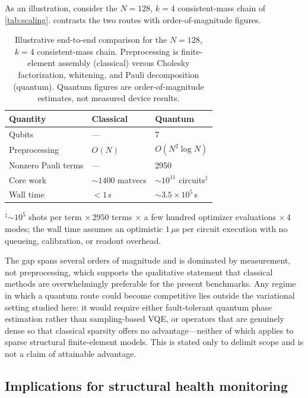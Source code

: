 \documentclass{ieeeaccess}
\begin{document}
As an illustration, consider the $N=128$, $k=4$ consistent-mass chain of \cref{tab:scaling}.  contrasts the two routes with order-of-magnitude figures.

\begin{table}[t]
\centering
\caption{Illustrative end-to-end comparison for the $N=128$, $k=4$ consistent-mass chain. Preprocessing is finite-element assembly (classical) versus Cholesky factorization, whitening, and Pauli decomposition (quantum). Quantum figures are order-of-magnitude estimates, not measured device results.}
\label{tab:concrete}
\begin{tabular}{lll}
\toprule
Quantity & Classical & Quantum\\
\midrule
Qubits & --- & 7\\
Preprocessing & $O(N)$ & $O(N^2\log N)$\\
Nonzero Pauli terms & --- & 2950\\
Core work & ${\sim}1400$ matvecs & ${\sim}10^{11}$ circuits$^{\ddagger}$\\
Wall time & ${<}1$\,s & ${\sim}3.5\times10^{5}$\,s\\
\bottomrule
\end{tabular}

\vspace{0.35em}
\parbox{\columnwidth}{\footnotesize $^{\ddagger}$${\sim}10^{5}$ shots per term $\times\,2950$ terms $\times$ a few hundred optimizer evaluations $\times\,4$ modes; the wall time assumes an optimistic $1\,\mu$s per circuit execution with no queueing, calibration, or readout overhead.}
\end{table}

The gap spans several orders of magnitude and is dominated by measurement, not preprocessing, which supports the qualitative statement that classical methods are overwhelmingly preferable for the present benchmarks. Any regime in which a quantum route could become competitive lies outside the variational setting studied here: it would require either fault-tolerant quantum phase estimation rather than sampling-based VQE, or operators that are genuinely dense so that classical sparsity offers no advantage---neither of which applies to sparse structural finite-element models. This is stated only to delimit scope and is not a claim of attainable advantage.

\subsection{Implications for structural health monitoring}
\end{document}
